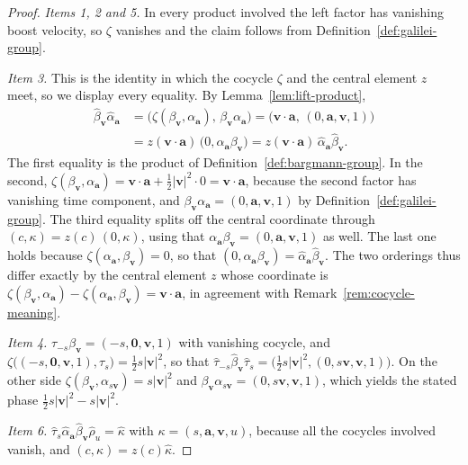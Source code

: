 \begin{proof}
	\emph{Items 1, 2 and 5.} In every product involved the left factor has vanishing boost velocity, so $\zeta$ vanishes and the claim follows from Definition~\ref{def:galilei-group}.
	
	\emph{Item 3.} This is the identity in which the cocycle $\zeta$ and the central element $z$ meet, so we display every equality. By Lemma~\ref{lem:lift-product},
	\begin{align*}
		\hat\beta_{\mathbf{v}}\hat\alpha_{\mathbf{a}}
		&=\big(\zeta(\beta_{\mathbf{v}},\alpha_{\mathbf{a}}),\,\beta_{\mathbf{v}}\alpha_{\mathbf{a}}\big)
		=\big(\mathbf{v}\cdot\mathbf{a},\,(0,\mathbf{a},\mathbf{v},1)\big)\\
		&=z(\mathbf{v}\cdot\mathbf{a})\,\big(0,\alpha_{\mathbf{a}}\beta_{\mathbf{v}}\big)
		=z(\mathbf{v}\cdot\mathbf{a})\,\hat\alpha_{\mathbf{a}}\hat\beta_{\mathbf{v}}.
	\end{align*}
	The first equality is the product of Definition~\ref{def:bargmann-group}. In the second, $\zeta(\beta_{\mathbf{v}},\alpha_{\mathbf{a}})=\mathbf{v}\cdot\mathbf{a}+\tfrac{1}{2}|\mathbf{v}|^2\cdot 0=\mathbf{v}\cdot\mathbf{a}$, because the second factor has vanishing time component, and $\beta_{\mathbf{v}}\alpha_{\mathbf{a}}=(0,\mathbf{a},\mathbf{v},1)$ by Definition~\ref{def:galilei-group}. The third equality splits off the central coordinate through $(c,\kappa)=z(c)\,(0,\kappa)$, using that $\alpha_{\mathbf{a}}\beta_{\mathbf{v}}=(0,\mathbf{a},\mathbf{v},1)$ as well. The last one holds because $\zeta(\alpha_{\mathbf{a}},\beta_{\mathbf{v}})=0$, so that $(0,\alpha_{\mathbf{a}}\beta_{\mathbf{v}})=\hat\alpha_{\mathbf{a}}\hat\beta_{\mathbf{v}}$. The two orderings thus differ exactly by the central element $z$ whose coordinate is $\zeta(\beta_{\mathbf{v}},\alpha_{\mathbf{a}})-\zeta(\alpha_{\mathbf{a}},\beta_{\mathbf{v}})=\mathbf{v}\cdot\mathbf{a}$, in agreement with Remark~\ref{rem:cocycle-meaning}.
	
	\emph{Item 4.} $\tau_{-s}\beta_{\mathbf{v}}=(-s,\mathbf{0},\mathbf{v},1)$ with vanishing cocycle, and $\zeta\big((-s,\mathbf{0},\mathbf{v},1),\tau_s\big)=\tfrac{1}{2}s|\mathbf{v}|^2$, so that $\hat\tau_{-s}\hat\beta_{\mathbf{v}}\hat\tau_s=\big(\tfrac{1}{2}s|\mathbf{v}|^2,(0,s\mathbf{v},\mathbf{v},1)\big)$. On the other side $\zeta(\beta_{\mathbf{v}},\alpha_{s\mathbf{v}})=s|\mathbf{v}|^2$ and $\beta_{\mathbf{v}}\alpha_{s\mathbf{v}}=(0,s\mathbf{v},\mathbf{v},1)$, which yields the stated phase $\tfrac{1}{2}s|\mathbf{v}|^2-s|\mathbf{v}|^2$.
	
	\emph{Item 6.} $\hat\tau_s\hat\alpha_{\mathbf{a}}\hat\beta_{\mathbf{v}}\hat\rho_u=\hat{\kappa}$ with $\kappa=(s,\mathbf{a},\mathbf{v},u)$, because all the cocycles involved vanish, and $(c,\kappa)=z(c)\hat\kappa$.
\end{proof}

